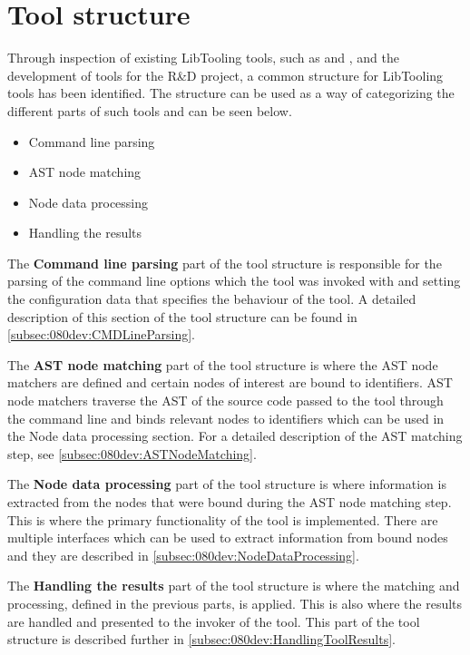 \section{Tool structure} \label{sec:080dev:tool_structure}

Through inspection of existing LibTooling tools, such as \cite{clangExternalClangExamples} and \cite{llvmLLVMCompilerInfrastructure2023}, and the development of tools for the R\&D project, a common structure for LibTooling tools has been identified. The structure can be used as a way of categorizing the different parts of such tools and can be seen below.

\begin{itemize}
    \item Command line parsing
    \item AST node matching
    \item Node data processing
    \item Handling the results
\end{itemize}

The \textbf{Command line parsing} part of the tool structure is responsible for the parsing of the command line options which the tool was invoked with and setting the configuration data that specifies the behaviour of the tool. A detailed description of this section of the tool structure can be found in \cref{subsec:080dev:CMDLineParsing}.

The \textbf{AST node matching} part of the tool structure is where the AST node matchers are defined and certain nodes of interest are bound to identifiers. AST node matchers traverse the AST of the source code passed to the tool through the command line and binds relevant nodes to identifiers which can be used in the Node data processing section. For a detailed description of the AST matching step, see \cref{subsec:080dev:ASTNodeMatching}.

The \textbf{Node data processing} part of the tool structure is where information is extracted from the nodes that were bound during the AST node matching step. This is where the primary functionality of the tool is implemented. There are multiple interfaces which can be used to extract information from bound nodes and they are described in \cref{subsec:080dev:NodeDataProcessing}.

The \textbf{Handling the results} part of the tool structure is where the matching and processing, defined in the previous parts, is applied. This is also where the results are handled and presented to the invoker of the tool. This part of the tool structure is described further in \cref{subsec:080dev:HandlingToolResults}.


